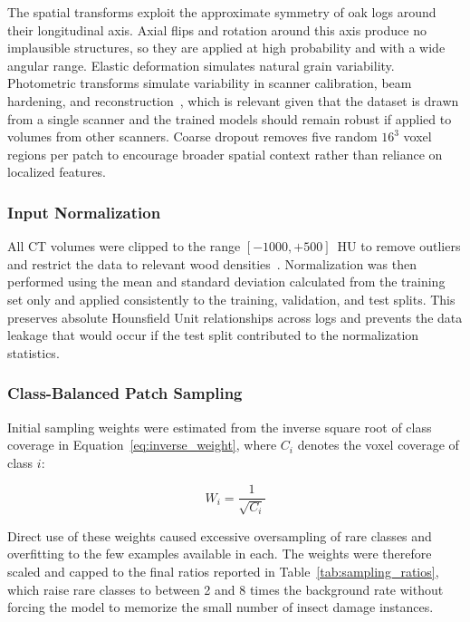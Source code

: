 The spatial transforms exploit the approximate symmetry of oak logs around their longitudinal axis. Axial flips and rotation around this axis produce no implausible structures, so they are applied at high probability and with a wide angular range. Elastic deformation simulates natural grain variability. Photometric transforms simulate variability in scanner calibration, beam hardening, and reconstruction~\cite{bushberg2011essential}, which is relevant given that the dataset is drawn from a single scanner and the trained models should remain robust if applied to volumes from other scanners. Coarse dropout removes five random $16^3$ voxel regions per patch to encourage broader spatial context rather than reliance on localized features.

\subsubsection{Input Normalization}

All CT volumes were clipped to the range $[-1000, +500]$~HU to remove outliers and restrict the data to relevant wood densities~\cite{freyburger2009measuring}. Normalization was then performed using the mean and standard deviation calculated from the training set only and applied consistently to the training, validation, and test splits. This preserves absolute Hounsfield Unit relationships across logs and prevents the data leakage that would occur if the test split contributed to the normalization statistics.

\subsubsection{Class-Balanced Patch Sampling}

Initial sampling weights were estimated from the inverse square root of class coverage in Equation~\ref{eq:inverse_weight}, where $C_i$ denotes the voxel coverage of class $i$:

\begin{equation}
    W_i = \frac{1}{\sqrt{C_i}}
    \label{eq:inverse_weight}
\end{equation}

Direct use of these weights caused excessive oversampling of rare classes and overfitting to the few examples available in each. The weights were therefore scaled and capped to the final ratios reported in Table~\ref{tab:sampling_ratios}, which raise rare classes to between 2 and 8 times the background rate without forcing the model to memorize the small number of insect damage instances.

